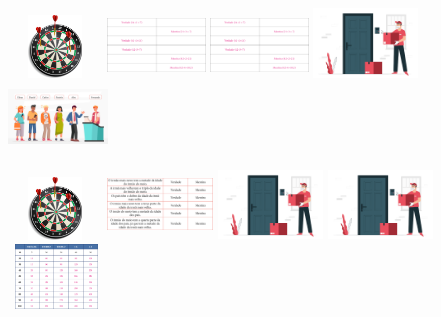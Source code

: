\begin{escolha}
\begin{escolha}
\begin{escolha}
\item \includegraphics[width=0.98131in,height=0.65625in]{media/image108.png}
\includegraphics[width=1.02736in,height=0.68704in]{media/image110.png}
\includegraphics[width=1.02736in,height=0.68704in]{media/image110.png}
\includegraphics[width=1.09268in,height=0.73073in]{media/image112.png}
\includegraphics[width=1.04264in,height=0.69727in]{media/image113.png}

\item \includegraphics[width=0.98131in,height=0.65625in]{media/image108.png}
\includegraphics[width=1.10972in,height=0.74212in]{media/image109.png}
\includegraphics[width=1.09268in,height=0.73073in]{media/image112.png}
\includegraphics[width=1.09268in,height=0.73073in]{media/image112.png}
\includegraphics[width=1.01042in,height=0.67572in]{media/image111.png}


\end{escolha}
\end{escolha}
\end{escolha}
